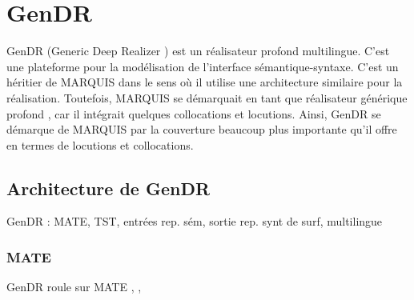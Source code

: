 
\chapter{GenDR}

GenDR (Generic Deep Realizer \citep{lareau18}) est un réalisateur profond multilingue. C'est une plateforme pour la modélisation de l'interface sémantique-syntaxe. C'est un héritier de MARQUIS dans le sens où il utilise une architecture similaire pour la réalisation. Toutefois, MARQUIS se démarquait en tant que réalisateur générique profond \citep{LambreyImplementationcollocationspour2017},\citep{lareau18}  car il intégrait quelques collocations et locutions. Ainsi, GenDR se démarque de MARQUIS par la couverture beaucoup plus importante qu'il offre en termes de locutions et collocations.

\section{Architecture de GenDR}

GenDR : MATE, TST, entrées rep. sém, sortie rep. synt de surf, multilingue

\subsection{MATE}

GenDR roule sur MATE \citep{BohnetDevelopmentEnvironmentMTTbased2000}, \citep{BohnetOpensourcegraph2010},\citep{Lareau2007TowardsAG}

